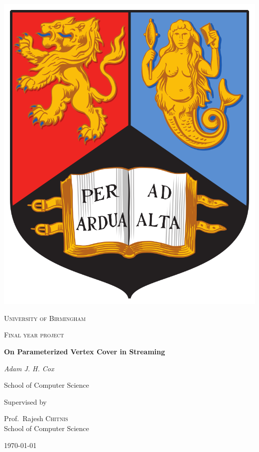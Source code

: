 \begin{titlepage}


\thispagestyle{empty}
\setlength\headheight{0pt} 
\begin{center}

    \center\includegraphics[width=0.25\linewidth]{img/uob.PNG}            

    \vspace{0.25cm}
    {\scshape\LARGE University of Birmingham \par}
    \vspace{0.25cm}
    {\scshape\Large Final year project\par}
    \vspace{0.5cm}

    {\Large\bfseries On Parameterized Vertex Cover in Streaming\par}

    \vspace{0.5cm}
    {\Large\itshape Adam J. H. Cox\par}
    School of Computer Science
    \vspace{0.25cm}

    \vspace{1cm}
    Supervised by\par
    Prof.~Rajesh \textsc{Chitnis} \\
    School of Computer Science\par
    \vspace{1.5cm}
    \large
    \today

\end{center}

\clearpage
\restoregeometry
\end{titlepage}
